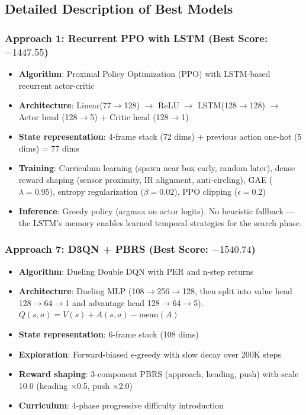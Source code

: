 \documentclass[10.5pt, oneside]{article}
\begin{document}
\subsection{Detailed Description of Best Models}

\subsubsection{Approach 1: Recurrent PPO with LSTM (Best Score: $-1447.55$)}

\begin{itemize}[nosep]
    \item \textbf{Algorithm}: Proximal Policy Optimization (PPO) with LSTM-based recurrent actor-critic
    \item \textbf{Architecture}: Linear(77$\to$128) $\to$ ReLU $\to$ LSTM(128$\to$128) $\to$ Actor head (128$\to$5) + Critic head (128$\to$1)
    \item \textbf{State representation}: 4-frame stack (72 dims) + previous action one-hot (5 dims) = 77 dims
    \item \textbf{Training}: Curriculum learning (spawn near box early, random later), dense reward shaping (sensor proximity, IR alignment, anti-circling), GAE ($\lambda\!=\!0.95$), entropy regularization ($\beta\!=\!0.02$), PPO clipping ($\epsilon\!=\!0.2$)
    \item \textbf{Inference}: Greedy policy (argmax on actor logits). No heuristic fallback --- the LSTM's memory enables learned temporal strategies for the search phase.
\end{itemize}

\subsubsection{Approach 7: D3QN + PBRS (Best Score: $-1540.74$)}

\begin{itemize}[nosep]
    \item \textbf{Algorithm}: Dueling Double DQN with PER and n-step returns
    \item \textbf{Architecture}: Dueling MLP (108$\to$256$\to$128, then split into value head 128$\to$64$\to$1 and advantage head 128$\to$64$\to$5). $Q(s,a) = V(s) + A(s,a) - \text{mean}(A)$
    \item \textbf{State representation}: 6-frame stack (108 dims)
    \item \textbf{Exploration}: Forward-biased $\epsilon$-greedy with slow decay over 200K steps
    \item \textbf{Reward shaping}: 3-component PBRS (approach, heading, push) with scale 10.0 (heading ×0.5, push ×2.0)
    \item \textbf{Curriculum}: 4-phase progressive difficulty introduction
\end{itemize}
\end{document}
